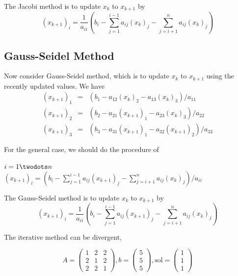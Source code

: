 \begin{definition}
    The Jacobi method is to update $x_k$ to $x_{k+1}$ by 
    \[
       (x_{k+1})_i = \frac{1}{a_{ii}} \left( b_i - \sum_{j=1}^{i-1} a_{ij} (x_k)_j - \sum_{j=i+1}^n a_{ij} (x_k)_j \right)
    \]
\end{definition}

\subsection{Gauss-Seidel Method}

Now consider Gauss-Seidel method, which is to update $x_k$ to $x_{k+1}$ using the recently updated values. We have
\begin{eqnarray*}
(x_{k+1})_1 &=& (b_1 - a_{12}(x_k)_2 - a_{13}(x_k)_3)/a_{11}\\
(x_{k+1})_2 &=& (b_2 - a_{21}(x_{k+1})_1 - a_{23}(x_k)_3)/a_{22}\\
(x_{k+1})_3 &=& (b_3 - a_{31}(x_{k+1})_1 - a_{32}(x_{k+1})_2)/a_{33}
\end{eqnarray*}

For the general case, we should do the procedure of
\begin{codebox}
\li \For $i = 1 \twodots n$
\Do
\li $(x_{k+1})_i =  ( b_i - \sum_{j=1}^{i-1} a_{ij} (x_{k+1})_j - \sum_{j=i+1}^n a_{ij} (x_k)_j )/ a_{ii}$
\End
\end{codebox}

\begin{definition}
    The Gauss-Seidel method is to update $x_k$ to $x_{k+1}$ by 
    \[
        (x_{k+1})_i = \frac{1}{a_{ii}} \left( b_i - \sum_{j=1}^{i-1} a_{ij} (x_{k+1})_j - \sum_{j=i+1}^n a_{ij} (x_k)_j \right)
    \]
\end{definition}

The iterative method can be divergent, 

\begin{eg}
    \begin{equation*}
    A =
    \begin{pmatrix}
      1 & 2 & 2 \\ 
    2 & 1 & 2 \\
    2 & 2 & 1
    \end{pmatrix},
    b =
    \begin{pmatrix}
      5 \\ 5 \\ 5
    \end{pmatrix},
    \mbox{sol} =
    \begin{pmatrix}
      1 \\ 1 \\ 1
    \end{pmatrix}
    \end{equation*}
\end{eg}

